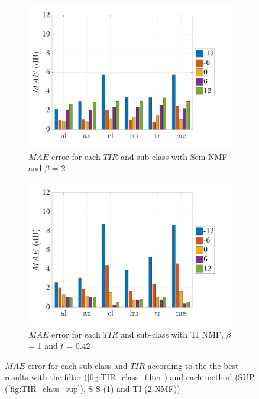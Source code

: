 \documentclass[twocolumn,a4paper,10pt]{article}
\begin{document}
\begin{figure}[t]
    \begin{subfigure}[t]{0.45\textwidth}
        \centering
      	\includegraphics[width=\linewidth]{figures/semi-sup_bar.pdf}
        \caption{$MAE$ error for each $TIR$ and sub-class with Sem NMF and $\beta$ = 2}
                \label{fig:TIR_class_semi}
    \end{subfigure}%
    \hfill
    \begin{subfigure}[t]{0.45\textwidth}
        \centering
        \includegraphics[width=\linewidth]{figures/TI_bar}
        \caption{$MAE$ error for each $TIR$ and sub-class with TI NMF, $\beta$ = 1 and $t$ = 0.42}
        \label{fig:TIR_class_TI}
    \end{subfigure}
    \caption{$MAE$ error for each sub-class and $TIR$ according to the the best results with the filter (\ref{fig:TIR_class_filter}) and each method (SUP (\ref{fig:TIR_class_sup}), S-S (\ref{fig:TIR_class_semi}) and TI (\ref{fig:TIR_class_TI} NMF))}
    \label{fig:TIR_bar}
\end{figure}
\end{document}
